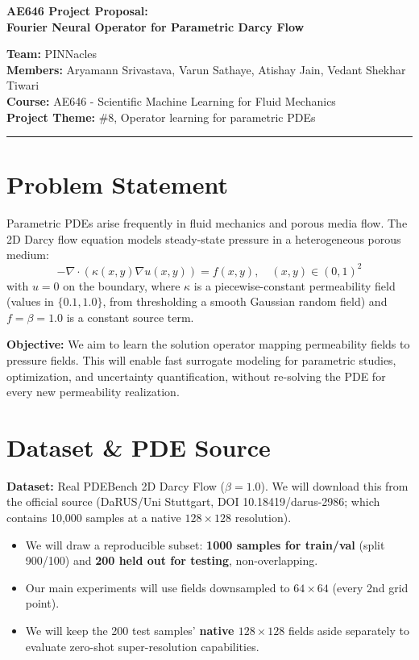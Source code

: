 \documentclass[12pt, a4paper]{article}
\begin{document}
\begin{center}
    \Large \textbf{AE646 Project Proposal:}\\
    \textbf{Fourier Neural Operator for Parametric Darcy Flow} \\[1em]
\end{center}

\noindent
\textbf{Team:} PINNacles \\
\textbf{Members:} Aryamann Srivastava, Varun Sathaye, Atishay Jain, Vedant Shekhar Tiwari \\
\textbf{Course:} AE646 - Scientific Machine Learning for Fluid Mechanics \\
\textbf{Project Theme:} \#8, Operator learning for parametric PDEs
\vspace{1em}
\hrule
\vspace{1.5em}

\section{Problem Statement}
Parametric PDEs arise frequently in fluid mechanics and porous media flow. The 2D Darcy flow equation models steady-state pressure in a heterogeneous porous medium:
\begin{equation*}
    -\nabla \cdot (\kappa(x,y) \nabla u(x,y)) = f(x,y), \quad (x,y) \in (0,1)^2
\end{equation*}
with $u = 0$ on the boundary, where $\kappa$ is a piecewise-constant permeability field (values in $\{0.1, 1.0\}$, from thresholding a smooth Gaussian random field) and $f = \beta = 1.0$ is a constant source term.

\vspace{0.5em}\noindent
\textbf{Objective:} We aim to learn the solution operator mapping permeability fields to pressure fields. This will enable fast surrogate modeling for parametric studies, optimization, and uncertainty quantification, without re-solving the PDE for every new permeability realization.

\section{Dataset \& PDE Source}
\textbf{Dataset:} Real PDEBench 2D Darcy Flow ($\beta=1.0$). We will download this from the official source (DaRUS/Uni Stuttgart, DOI 10.18419/darus-2986; which contains 10,000 samples at a native $128 \times 128$ resolution).

\begin{itemize}[noitemsep, topsep=2pt]
    \item We will draw a reproducible subset: \textbf{1000 samples for train/val} (split 900/100) and \textbf{200 held out for testing}, non-overlapping.
    \item Our main experiments will use fields downsampled to \textbf{$64 \times 64$} (every 2nd grid point).
    \item We will keep the 200 test samples' \textbf{native $128 \times 128$} fields aside separately to evaluate zero-shot super-resolution capabilities.
\end{itemize}
\end{document}
